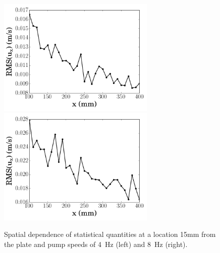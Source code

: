 \documentclass[12pt,oneside,a4paper]{article}
\begin{document}
\begin{figure}
\includegraphics[width=7.5cm]{images/LDA_spaceDependenceImages/4Hz_15mm_RMSux.png}\hfill
\includegraphics[width=7.5cm]{images/LDA_spaceDependenceImages/8Hz_15mm_RMSux.png}
\caption{Spatial dependence of statistical quantities at a location 15mm from the plate and pump speeds of \SI{4}{Hz} (left) and \SI{8}{Hz} (right).}
\label{figure:experiments:spaceDependence}
\end{figure}
%
\end{document}

